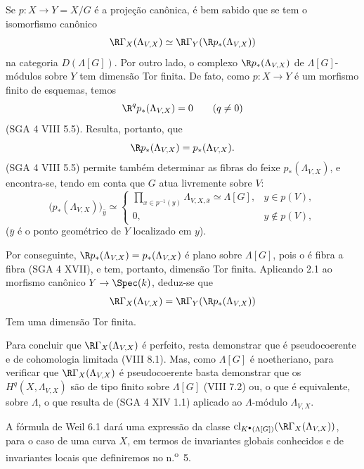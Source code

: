 \begin{prooftext}[Demonstração]
Se $p:X\to Y=X/G$ é a projeção canônica, é bem sabido que se tem o isomorfismo canônico
\[
\R\Gamma_X(\Lambda_{V,X})\simeq \R\Gamma_Y(\R p_*(\Lambda_{V,X}))
\]
na categoria $D(\Lambda[G])$. Por outro lado, o complexo $\R p_*(\Lambda_{V,X})$ de $\Lambda[G]$-módulos sobre $Y$ tem dimensão Tor finita. De fato, como $p:X\to Y$ é um morfismo finito de esquemas, temos
\[
\R^q p_*(\Lambda_{V,X})=0\qquad(q\ne0)
\]
(SGA 4 VIII 5.5). Resulta, portanto, que
\[
\R p_*(\Lambda_{V,X})=p_*(\Lambda_{V,X}).
\]
(SGA 4 VIII 5.5) permite também determinar as fibras do feixe $p_*(\Lambda_{V,X})$, e encontra-se, tendo em conta que $G$ atua livremente sobre $V$:
\[
\bigl(p_*(\Lambda_{V,X})\bigr)_{\bar y}\simeq
\begin{cases}
\displaystyle \prod_{x\in p^{-1}(y)}\Lambda_{V,X,\bar x}\simeq \Lambda[G],& y\in p(V),\\[1em]
0,& y\notin p(V),
\end{cases}
\]
($\bar y$ é o ponto geométrico de $Y$ localizado em $y$).

Por conseguinte, $\R p_*(\Lambda_{V,X})=p_*(\Lambda_{V,X})$ é plano sobre $\Lambda[G]$, pois o é fibra a fibra (SGA 4 XVII), e tem, portanto, dimensão Tor finita. Aplicando 2.1 ao morfismo canônico $Y\to\Spec(k)$, deduz-se que
\[
\R\Gamma_X(\Lambda_{V,X})=\R\Gamma_Y(\R p_*(\Lambda_{V,X}))
\]
Tem uma dimensão Tor finita.

Para concluir que $\R\Gamma_X(\Lambda_{V,X})$ é perfeito, resta demonstrar que é pseudocoerente e de cohomologia limitada (VIII 8.1). Mas, como $\Lambda[G]$ é noetheriano, para verificar que $\R\Gamma_X(\Lambda_{V,X})$ é pseudocoerente basta demonstrar que os $H^q(X,\Lambda_{V,X})$ são de tipo finito sobre $\Lambda[G]$ (VIII 7.2) ou, o que é equivalente, sobre $\Lambda$, o que resulta de (SGA 4 XIV 1.1) aplicado ao $\Lambda$-módulo $\Lambda_{V,X}$.
\end{prooftext}

A fórmula de Weil 6.1 dará uma expressão da classe $\operatorname{cl}_{K^\bullet(\Lambda[G])}(\R\Gamma_X(\Lambda_{V,X}))$, para o caso de uma curva $X$, em termos de invariantes globais conhecidos e de invariantes locais que definiremos no n.\textsuperscript{o}~5.
